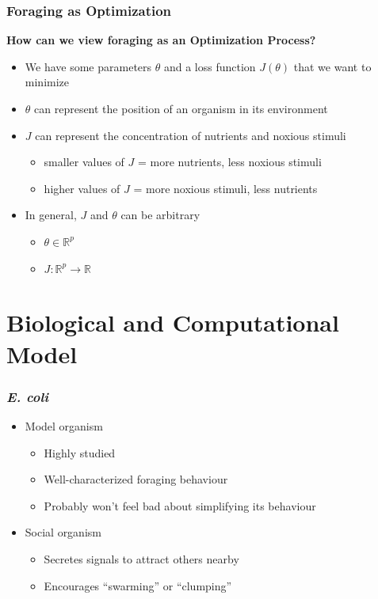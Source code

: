 \documentclass{beamer}
\begin{document}
\begin{frame}
\frametitle{Foraging as Optimization}
\textbf{How can we view foraging as an Optimization Process?}
\begin{itemize}
  \item<1-> We have some parameters $\theta$ and a loss function $J(\theta)$ that we want to minimize
  \item<2-> $\theta$ can represent the position of an organism in its environment
  \item<3-> $J$ can represent the concentration of nutrients and noxious stimuli
  \begin{itemize}
    \item smaller values of $J$ = more nutrients, less noxious stimuli
    \item higher values of $J$ = more noxious stimuli, less nutrients
  \end{itemize}
  \item<4-> In general, $J$ and $\theta$ can be arbitrary
  \begin{itemize}
    \item $\theta \in \mathbb{R}^p$
    \item $J: \mathbb{R}^p \to \mathbb{R}$
  \end{itemize}
\end{itemize}
\end{frame}

\section{Biological and Computational Model}
\begin{frame}
\frametitle{\textit{E. coli}}
\begin{itemize}
  \item<1-> Model organism
  \begin{itemize}
    \item<2-> Highly studied
    \item<3-> Well-characterized foraging behaviour
    \item<4-> Probably won't feel bad about simplifying its behaviour
  \end{itemize}
  \item<5-> Social organism
  \begin{itemize}
    \item<6-> Secretes signals to attract others nearby
    \item<7-> Encourages ``swarming'' or ``clumping''
  \end{itemize}
\end{itemize}
\end{frame}
\end{document}
